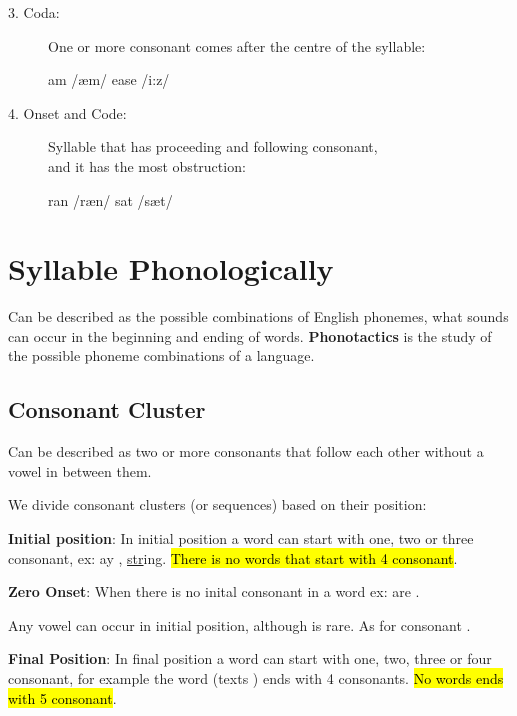 \documentclass[12pt, a4paper]{article}
\begin{document}
{\begin{description}
  \item[3. Coda:]One or more consonant comes after the centre of the 
    syllable:\medbreak

    \centerline{am /æm/ \hspace{2cm} ease /i:z/}

  \item[4. Onset and Code:]Syllable that has proceeding and following
    consonant,\\and it has the most obstruction:\medbreak

    \centerline{ran /ræn/ \hspace{2cm} sat /sæt/}
  
\end{description}

\section*{Syllable Phonologically}
Can be described as the possible combinations of English phonemes,
what sounds can occur in the beginning and ending of words.
\textbf{Phonotactics} is the study of the possible phoneme combinations of a language.

\subsection*{Consonant Cluster}
Can be described as two or more consonants that follow each other without 
a vowel in between them.\medbreak

We divide consonant clusters (or sequences) based on their position:\medbreak

\textbf{Initial position}: In initial position a word can start with one,
two or three consonant,  ex: ay , \underline{str}ing.
\hl{There is no words that start with 
4 consonant}.\medbreak 

\textbf{Zero Onset}: When there is no inital consonant in a word ex:
are .\medbreak

Any vowel can occur in initial position, although  is 
rare. As for consonant .\bigbreak

\textbf{Final Position}: In final position a word can start with one,
two, three or four consonant, for example the word (texts
) ends with 4 consonants. \hl{No words ends with 5 consonant}.\medbreak

}
\end{document}
